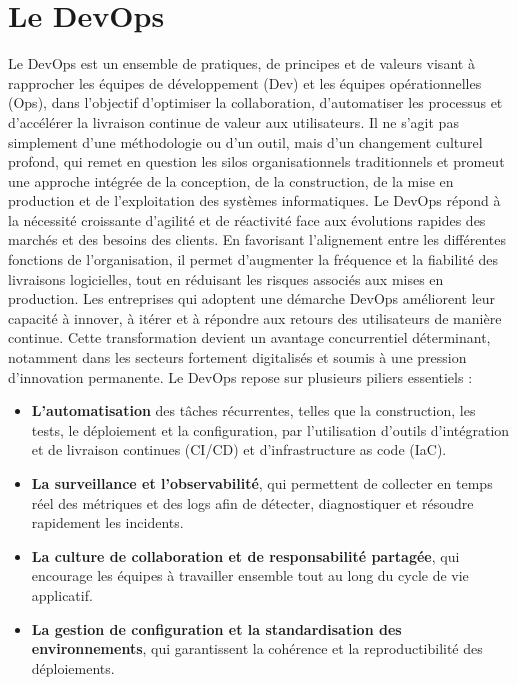 \section{Le DevOps}

Le DevOps est un ensemble de pratiques, de principes et de valeurs visant à rapprocher les équipes de développement (Dev) et les équipes opérationnelles (Ops), dans l’objectif d’optimiser la collaboration, d’automatiser les processus et d’accélérer la livraison continue de valeur aux utilisateurs. Il ne s’agit pas simplement d’une méthodologie ou d’un outil, mais d’un changement culturel profond, qui remet en question les silos organisationnels traditionnels et promeut une approche intégrée de la conception, de la construction, de la mise en production et de l’exploitation des systèmes informatiques.
Le DevOps répond à la nécessité croissante d’agilité et de réactivité face aux évolutions rapides des marchés et des besoins des clients. En favorisant l’alignement entre les différentes fonctions de l’organisation, il permet d’augmenter la fréquence et la fiabilité des livraisons logicielles, tout en réduisant les risques associés aux mises en production. Les entreprises qui adoptent une démarche DevOps améliorent leur capacité à innover, à itérer et à répondre aux retours des utilisateurs de manière continue. Cette transformation devient un avantage concurrentiel déterminant, notamment dans les secteurs fortement digitalisés et soumis à une pression d’innovation permanente.
Le DevOps repose sur plusieurs piliers essentiels :
\begin{itemize}
	\item \textbf{L’automatisation} des tâches récurrentes, telles que la construction, les tests, le déploiement et la configuration, par l’utilisation d’outils d’intégration et de livraison continues (CI/CD) et d’infrastructure as code (IaC).
	\item \textbf{La surveillance et l’observabilité}, qui permettent de collecter en temps réel des métriques et des logs afin de détecter, diagnostiquer et résoudre rapidement les incidents.
	\item \textbf{La culture de collaboration et de responsabilité partagée}, qui encourage les équipes à travailler ensemble tout au long du cycle de vie applicatif.
	\item \textbf{La gestion de configuration et la standardisation des environnements}, qui garantissent la cohérence et la reproductibilité des déploiements.
\end{itemize}


